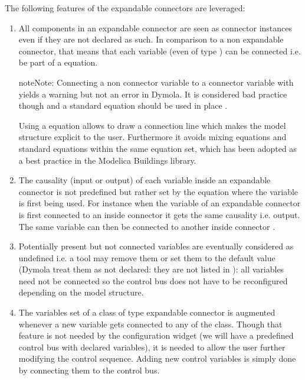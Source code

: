 \documentclass[letterpaper,10pt, openany,english]{sphinxmanual}
\begin{document}
The following features of the expandable connectors are leveraged:
\begin{enumerate}
%
\item {} 
All components in an expandable connector are seen as connector instances even if they are not declared as such. In comparison to a non expandable connector, that means that each variable (even of type ) can be connected i.e. be part of a  equation.

\begin{sphinxadmonition}{note}{Note:}
Connecting a non connector variable to a connector variable with  yields a warning but not an error in Dymola. It is considered bad practice though and a standard equation should be used in place .

Using a  equation allows to draw a connection line which makes the model structure explicit to the user. Furthermore it avoids mixing  equations and standard equations within the same equation set, which has been adopted as a best practice in the Modelica Buildings library.
\end{sphinxadmonition}

\item {} 
The causality (input or output) of each variable inside an expandable connector is not predefined but rather set by the  equation where the variable is first being used. For instance when the variable of an expandable connector is first connected to an inside connector  it gets the same causality i.e. output. The same variable can then be connected to another inside connector  .

\item {} 
Potentially present but not connected variables are eventually considered as undefined i.e. a tool may remove them or set them to the default value (Dymola treat them as not declared: they are not listed in ): all variables need not be connected so the control bus does not have to be reconfigured depending on the model structure.

\item {} 
The variables set of a class of type expandable connector is augmented whenever a new variable gets connected to any  of the class. Though that feature is not needed by the configuration widget (we will have a predefined control bus with declared variables), it is needed to allow the user further modifying the control sequence. Adding new control variables is simply done by connecting them to the control bus.

\end{enumerate}
\end{document}
